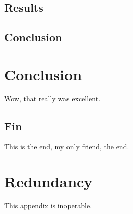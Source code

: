 \documentclass[onehalf,11pt]{beavtex}
\begin{document}
\section{Results}

\section{Conclusion}

\chapter{Conclusion}
Wow, that really was excellent.
\section{Fin}
This is the end, my only friend, the end.





\appendix
\chapter{Redundancy}
This appendix is inoperable.
\end{document}
